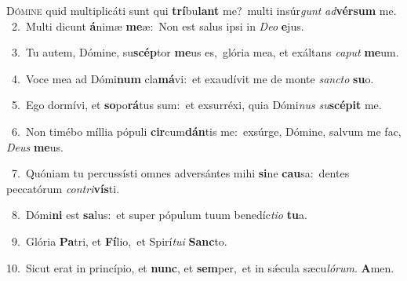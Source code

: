 \lettrine{\initial\textcolor{\initialcolor}{D}}{ómine} quid multiplicáti sunt qui \textbf{trí}\-bu\textbf{lant} me?~\star multi insúr\textit{gunt} \textit{ad}\-\textbf{vér}\textbf{sum} me.\\
{\numbfont\textcolor{\numbcolor}{~2.}}~Multi dicunt \textbf{á}\-nimæ \textbf{me}\-æ:~\star Non est salus ipsi in \textit{De}\-\textit{o} \textbf{e}\-jus.\par
{\numbfont\textcolor{\numbcolor}{~3.}}~Tu autem, Dómine, su\-\textbf{scép}\-tor \textbf{me}\-us es,~\star glória mea, et exáltans \textit{ca}\-\textit{put} \textbf{me}\-um.\par
{\numbfont\textcolor{\numbcolor}{~4.}}~Voce mea ad Dómi\textbf{num} cla\-\textbf{má}\-vi:~\star et exaudívit me de monte \textit{sanc}\-\textit{to} \textbf{su}\-o.\par
{\numbfont\textcolor{\numbcolor}{~5.}}~Ego dormívi, et \textbf{so}\-po\-\textbf{rá}\-tus sum:~\star et exsurréxi, quia Dómi\textit{nus} \textit{su}\-\textbf{scé}\textbf{pit} me.\par
{\numbfont\textcolor{\numbcolor}{~6.}}~Non timébo míllia pópuli \textbf{cir}\-cum\-\textbf{dán}\-tis me:~\star exsúrge, Dómine, salvum me fac, \textit{De}\-\textit{us} \textbf{me}\-us.\par
{\numbfont\textcolor{\numbcolor}{~7.}}~Quóniam tu percussísti omnes adversántes mihi \textbf{si}\-ne \textbf{cau}\-sa:~\star dentes peccatórum \textit{con}\-\textit{tri}\textbf{vís}ti.\par
{\numbfont\textcolor{\numbcolor}{~8.}}~Dómi\textbf{ni} est \textbf{sa}\-lus:~\star et super pópulum tuum benedíc\-\textit{ti}\-\textit{o} \textbf{tu}\-a.\par
{\numbfont\textcolor{\numbcolor}{~9.}}~Glória \textbf{Pa}\-tri, et \textbf{Fí}\-lio,~\star et Spirí\-\textit{tu}\-\textit{i} \textbf{Sanc}\-to.\par
{\numbfont\textcolor{\numbcolor}{10.}}~Sicut erat in princípio, et \textbf{nunc}\-, et \textbf{sem}\-per,~\star et in sǽcula sæcu\-\textit{ló}\-\textit{rum}. \textbf{A}\-men.\par

